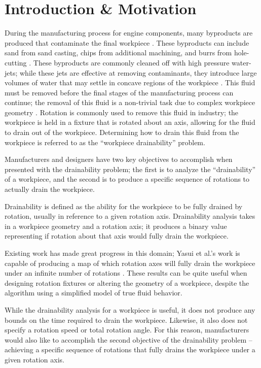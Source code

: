 							\chapter{Introduction \& Motivation}


During the manufacturing process for engine components, many byproducts are produced that contaminate the final workpiece \cite{Hancock94}. These byproducts can include sand from sand casting, chips from additional machining, and burrs from hole-cutting \cite{Arbelaez}.
These byproducts are commonly cleaned off with high pressure water-jets; while these jets are effective at removing contaminants, they introduce large volumes of water that may settle in concave regions of the workpiece \cite{Arbelaez}. This fluid must be removed before the final stages of the manufacturing process can continue; the removal of this fluid is a non-trivial task due to complex workpiece geometry \cite{Avila} \cite{Yasui2011}. Rotation is commonly used to remove this fluid in industry; the workpiece is held in a fixture that is rotated about an axis, allowing for the fluid to drain out of the workpiece. Determining how to drain this fluid from the workpiece is referred to as the ``workpiece drainability'' problem.

Manufacturers and designers have two key objectives to accomplish when presented with the drainability problem; the first is to analyze the ``drainability'' of a workpiece, and the second is to produce a specific sequence of rotations to actually drain the workpiece.

Drainability is defined as the ability for the workpiece to be fully drained by rotation, usually in reference to a given rotation axis. Drainability analysis takes in a workpiece geometry and a rotation axis; it produces a binary value representing if rotation about that axis would fully drain the workpiece.

Existing work has made great progress in this domain; Yasui et al.'s work is capable of producing a map of which rotation axes will fully drain the workpiece under an infinite number of rotations \cite{Yasui2011}. These results can be quite useful when designing rotation fixtures or altering the geometry of a workpiece, despite the algorithm using a simplified model of true fluid behavior.

While the drainability analysis for a workpiece is useful, it does not produce any bounds on the time required to drain the workpiece. Likewise, it also does not specify a rotation speed or total rotation angle. For this reason, manufacturers would also like to accomplish the second objective of the drainability problem -- achieving a specific sequence of rotations that fully drains the workpiece under a given rotation axis.

